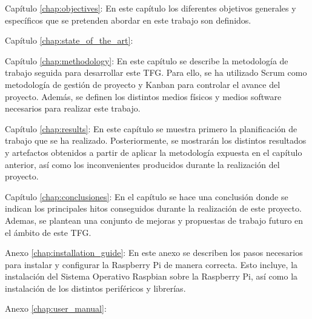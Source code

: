 \begin{definitionlist}
	\item[Capítulo \ref{chap:objectives}: \nameref{chap:objectives}] En este capítulo los diferentes objetivos generales y específicos que se pretenden abordar en este trabajo son definidos.
	
	\item[Capítulo \ref{chap:state_of_the_art}: \nameref{chap:state_of_the_art}] 
	
	\item[Capítulo \ref{chap:methodology}: \nameref{chap:methodology}] En este capítulo se describe la metodología de trabajo seguida para desarrollar este \ac{TFG}. Para ello, se ha utilizado Scrum como metodología de gestión de proyecto y Kanban para controlar el avance del proyecto. Además, se definen los distintos medios físicos y medios software necesarios para realizar este trabajo.
	
	\item[Capítulo \ref{chap:results}: \nameref{chap:results}] En este capítulo se muestra primero la planificación de trabajo que se ha realizado. Posteriormente, se mostrarán los distintos resultados y artefactos obtenidos a partir de aplicar la metodología expuesta en el capítulo anterior, así como los inconvenientes producidos durante la realización del proyecto.
	
	\item[Capítulo \ref{chap:conclusiones}: \nameref{chap:conclusiones}] En el capítulo se hace una conclusión donde se indican los principales hitos conseguidos durante la realización de este proyecto. Ademas, se plantean una conjunto de mejoras y propuestas de trabajo futuro en el ámbito de este \ac{TFG}. 
	
	\item[Anexo \ref{chap:installation_guide}: \nameref{chap:installation_guide}] En este anexo se describen los pasos necesarios para instalar y configurar la Raspberry Pi de manera correcta. Esto incluye, la instalación del Sistema Operativo Raspbian sobre la Raspberry Pi, así como la instalación de los distintos periféricos y librerías.
	
	\item[Anexo \ref{chap:user_manual}: \nameref{chap:user_manual}] 
	
\end{definitionlist}




